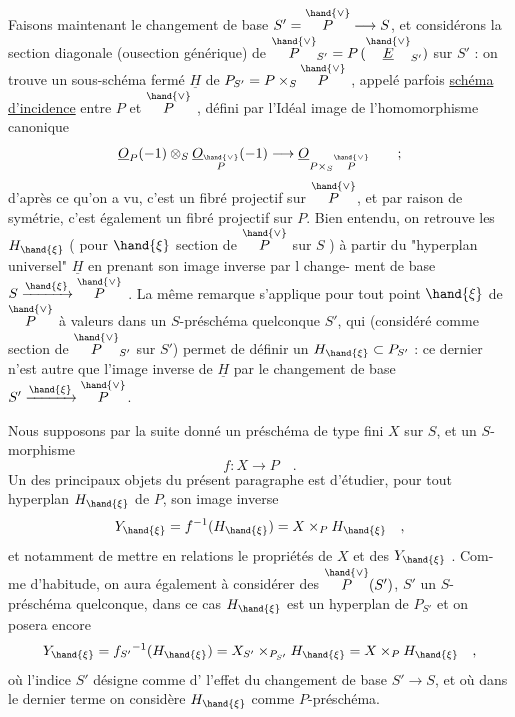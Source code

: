 
Faisons maintenant le changement de base $S'=\overset{\hand{\vee}}{P}\longrightarrow S$, et considérons
la section diagonale (ousection générique) de $\overset{\hand{\vee}}{P}_{S'} = P\,(\overset{\hand{\vee}}{\underline{E}}_{S'})$ sur $S'$ :
on trouve un sous-schéma fermé $\underline{H}$ de $P_{S'} = P\times_S\overset{\hand{\vee}}{P}$ , appelé parfois
\uline{schéma d'incidence} entre $P$ et $\overset{\hand{\vee}}{P}$ , défini par l'Idéal image de
l'homomorphisme canonique
\[ \underline{O}_P(-1)\otimes_S\underline{O}_{\overset{\hand{\vee}}{P}}(-1)\longrightarrow \underline{O}_{P\times_S\overset{\hand{\vee}}{P}} \qquad ; \]
d'après ce qu'on a vu, c'est un fibré projectif sur $\overset{\hand{\vee}}{P}$, et par raison de
symétrie, c'est également un fibré projectif sur $P$. Bien entendu, on
retrouve les $H_{\hand{\xi}}$ ( pour $\hand{\xi}$ section de $\overset{\hand{\vee}}{P}$ sur $S$ )\hand{,} à partir
du "hyperplan universel" $\underline{H}$\hand{,} en prenant son image inverse par l change-%
ment de base $S\xrightarrow{\hand{\xi}}\overset{\hand{\vee}}{P}$ . La même remarque s'applique pour tout point
$\hand{\xi}$ de $\overset{\hand{\vee}}{P}$ à valeurs dans un $S$-préschéma quelconque $S'$, qui (considéré comme
section de $\overset{\hand{\vee}}{P}_{S'}$ sur $S'$) permet de définir un $H_{\hand{\xi}}\subset P_{S'}$ : ce dernier n'est
autre que l'image inverse de $\underline{H}$ par le changement de base $S'\xrightarrow{\hand{\xi}}\overset{\hand{\vee}}{P}$.

Nous supposons par la suite donné un préschéma de type fini $X$ sur $S$,
et un $S$-morphisme
\[ f\colon X\longrightarrow P \quad . \]
\margin{$|$}Un des principaux objets\hand{,} du présent paragraphe est d'étudier, pour tout
\margin{$|$}hyperplan $H_{\hand{\xi}}$ de $P$,  son image inverse
\[ Y_{\hand{\xi}} = f^{-1}(H_{\hand{\xi}}) = X\times_P H_{\hand{\xi}} \quad , \]
et notamment de mettre en relations le propriétés de $X$ et des $Y_{\hand{\xi}}$ . Com-%
me d'habitude, on aura également à considérer des $\overset{\hand{\vee}}{P}(S')$, $S'$ 
un $S$-préschéma quelconque, dans ce cas $H_{\hand{\xi}}$ est un hyperplan de $P_{S'}$ \hand{,}
et on posera encore
\[ Y_{\hand{\xi}} = f_{S'}{}^{-1}(H_{\hand{\xi}}) = X_{S'}\times_{P_{S'}}H_{\hand{\xi}} = X\times_P H_{\hand{\xi}} \quad , \]
où l'indice $S'$ désigne comme d'  l'effet du changement de base
$S'\longrightarrow S$, et où dans le dernier terme on considère $H_{\hand{\xi}}$ comme $P$-préschéma.

